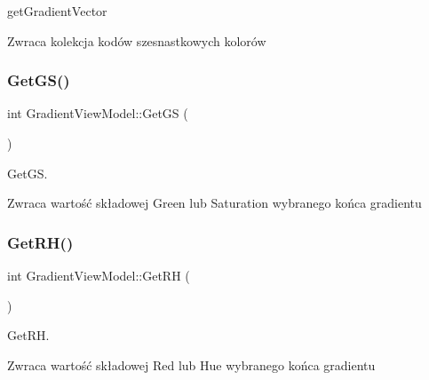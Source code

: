 get\+Gradient\+Vector 

\begin{DoxyReturn}{Zwraca}
kolekcja kodów szesnastkowych kolorów 
\end{DoxyReturn}
\mbox{\label{class_gradient_view_model_a2df0db48205c8f0f7c72743c1a5f960d}} 
\subsubsection{\texorpdfstring{Get\+G\+S()}{GetGS()}}
{\footnotesize\ttfamily int Gradient\+View\+Model\+::\+Get\+GS (\begin{DoxyParamCaption}{ }\end{DoxyParamCaption})}



Get\+GS. 

\begin{DoxyReturn}{Zwraca}
wartość składowej Green lub Saturation wybranego końca gradientu 
\end{DoxyReturn}
\mbox{\label{class_gradient_view_model_af2ca9997921048e2ded10b40fd947ae5}} 
\subsubsection{\texorpdfstring{Get\+R\+H()}{GetRH()}}
{\footnotesize\ttfamily int Gradient\+View\+Model\+::\+Get\+RH (\begin{DoxyParamCaption}{ }\end{DoxyParamCaption})}



Get\+RH. 

\begin{DoxyReturn}{Zwraca}
wartość składowej Red lub Hue wybranego końca gradientu 
\end{DoxyReturn}
\mbox{\label{class_gradient_view_model_afbe2bb56ec39369736a0e4969a94de5b}} 
